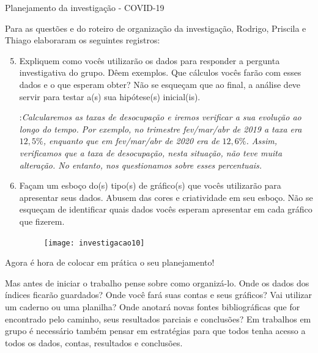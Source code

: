 \begin{example}{Planejamento da investigação - COVID-19}

Para as questões  e  do roteiro de organização da investigação, Rodrigo, Priscila e Thiago elaboraram os seguintes registros:

\begin{enumerate}[label=\titem{\arabic*)}]\setcounter{enumi}{4}
\item Expliquem como vocês utilizarão os dados para responder a pergunta investigativa do grupo. Dêem exemplos. Que cálculos vocês farão com esses dados e o que esperam obter? Não se esqueçam que ao final, a análise deve servir para testar a(s) sua hipótese(s) inicial(is).

:\textit{Calcularemos as taxas de desocupação e iremos verificar a sua evolução ao longo do tempo. Por exemplo, no trimestre fev/mar/abr de 2019 a taxa era $12,5\%$, enquanto que em fev/mar/abr de 2020 era de $12,6\%$.  Assim, verificamos que a taxa de desocupação, nesta situação, não teve muita alteração. No entanto, nos questionamos sobre esses percentuais.}

\item Façam um esboço do(s) tipo(s) de gráfico(s) que vocês utilizarão para apresentar seus dados. Abusem das cores e criatividade em seu esboço. Não se esqueçam de identificar quais dados vocês esperam apresentar em cada gráfico que fizerem.

\begin{figure}[H]
\centering

\texttt{[image: investigacao10]}
\end{figure}

\end{enumerate}

\end{example}


\label{etapa4}

Agora é hora de colocar em prática o seu planejamento!

Mas antes de iniciar o trabalho pense sobre como organizá-lo. Onde os dados dos índices ficarão guardados? Onde você fará suas contas e seus gráficos? Vai utilizar um caderno ou uma planilha? Onde anotará novas fontes bibliográficas que for encontrado pelo caminho, seus resultados parciais e conclusões? Em trabalhos em grupo é necessário também pensar em estratégias para que todos tenha acesso a todos os dados, contas, resultados e conclusões. 

